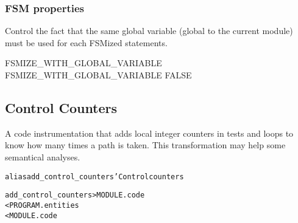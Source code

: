 \documentclass[a4paper]{report}
\newenvironment{PipsMake}{\begin{alltt}}{\end{alltt}}
\begin{document}
\subsubsection{FSM properties}

Control the fact that the same global variable (global to the
current module) must be used for each FSMized statements.

\begin{PipsProp}{FSMIZE_WITH_GLOBAL_VARIABLE}
FSMIZE_WITH_GLOBAL_VARIABLE FALSE
\end{PipsProp}

\subsection{Control Counters}

A code instrumentation that adds local integer counters in tests and loops
to know how many times a path is taken. This transformation may
help some semantical analyses.

\begin{PipsMake}
alias add_control_counters 'Control counters

add_control_counters    > MODULE.code
        < PROGRAM.entities
        < MODULE.code
\end{PipsMake}







\end{document}
